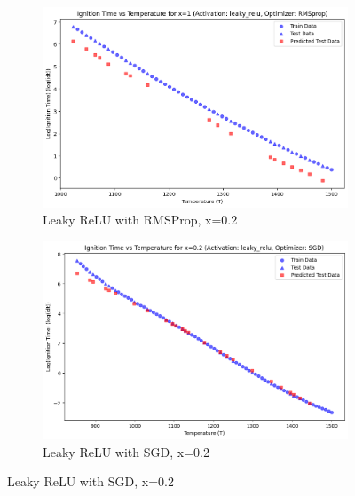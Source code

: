 \documentclass[12pt]{report}
\begin{document}
\begin{figure}[H]
    \centering
    \begin{subfigure}[t]{0.48\textwidth}
        \centering
        \includegraphics[width=\textwidth, keepaspectratio]{leaky_rms_1.png}
        \caption{Leaky ReLU with RMSProp, x=0.2}
    \end{subfigure}
    \hfill
    \begin{subfigure}[t]{0.48\textwidth}
        \centering
        \includegraphics[width=\textwidth, keepaspectratio]{leaky_sgd_02.png}
        \caption{Leaky ReLU with SGD, x=0.2}
    \end{subfigure}
\end{figure}
\end{document}
